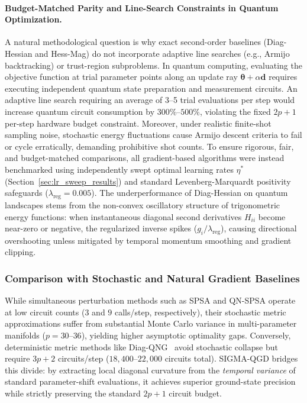 \documentclass[11pt,a4paper]{article}
\begin{document}
\paragraph{Budget-Matched Parity and Line-Search Constraints in Quantum Optimization.}
A natural methodological question is why exact second-order baselines (Diag-Hessian and Hess-Mag) do not incorporate adaptive line searches (e.g., Armijo backtracking) or trust-region subproblems. In quantum computing, evaluating the objective function at trial parameter points along an update ray $\boldsymbol{\theta} + \alpha \mathbf{d}$ requires executing independent quantum state preparation and measurement circuits. An adaptive line search requiring an average of 3--5 trial evaluations per step would increase quantum circuit consumption by $300\%\text{--}500\%$, violating the fixed $2p+1$ per-step hardware budget constraint. Moreover, under realistic finite-shot sampling noise, stochastic energy fluctuations cause Armijo descent criteria to fail or cycle erratically, demanding prohibitive shot counts. To ensure rigorous, fair, and budget-matched comparisons, all gradient-based algorithms were instead benchmarked using independently swept optimal learning rates $\eta^*$ (Section~\ref{sec:lr_sweep_results}) and standard Levenberg-Marquardt positivity safeguards ($\lambda_{\text{reg}} = 0.005$). The underperformance of Diag-Hessian on quantum landscapes stems from the non-convex oscillatory structure of trigonometric energy functions: when instantaneous diagonal second derivatives $H_{ii}$ become near-zero or negative, the regularized inverse spikes ($g_i / \lambda_{\text{reg}}$), causing directional overshooting unless mitigated by temporal momentum smoothing and gradient clipping.

\subsubsection{Comparison with Stochastic and Natural Gradient Baselines}
While simultaneous perturbation methods such as SPSA and QN-SPSA operate at low circuit counts ($3$ and $9$ calls/step, respectively), their stochastic metric approximations suffer from substantial Monte Carlo variance in multi-parameter manifolds ($p=30\text{--}36$), yielding higher asymptotic optimality gaps. Conversely, deterministic metric methods like Diag-QNG~\cite{stokes2020quantum} avoid stochastic collapse but require $3p+2$ circuits/step ($18,400\text{--}22,000$ circuits total). SIGMA-QGD bridges this divide: by extracting local diagonal curvature from the \emph{temporal variance} of standard parameter-shift evaluations, it achieves superior ground-state precision while strictly preserving the standard $2p+1$ circuit budget.
\end{document}
